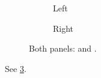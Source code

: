 \documentclass{article}
\begin{document}
\begin{figure}
  \begin{subfigure}{0.45\textwidth}
    \caption{Left}\label{fig:sub1}
  \end{subfigure}
  \begin{subfigure}{0.45\textwidth}
    \caption{Right}\label{fig:sub2}
  \end{subfigure}
  \caption{Both panels:  and .}\label{fig:both}
\end{figure}
See \ref{fig:both}.
\end{document}
